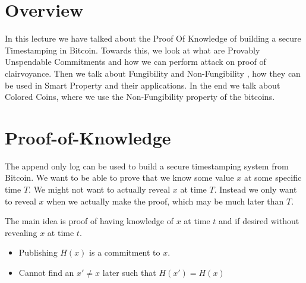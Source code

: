 \documentclass[10pt,a4paper]{article}
\begin{document}
\section{Overview}
In this lecture we have talked about the Proof Of Knowledge of building a secure Timestamping in Bitcoin. Towards this, we look at what are Provably Unspendable Commitments and how we can perform attack on proof of clairvoyance. Then we talk about Fungibility and Non-Fungibility , how they can be used in Smart Property and their applications. In the end we talk about Colored Coins, where we use the Non-Fungibility property of the bitcoins.

\section{Proof-of-Knowledge}
The append only log can be used to build a secure timestamping system from Bitcoin. We want to be able to prove that we know some value $x$ at some specific time $T$. We might not want to actually reveal $x$ at time $T$. Instead we only want to reveal $x$ when we actually make the proof, which may be much later than $T$.

The main idea is proof of having knowledge of $x$ at time $t$ and if desired without revealing $x$ at time $t$.
\begin{itemize}
    \item \textit{} Publishing $H(x)$ is a commitment to $x$.
    \item \textit{} Cannot find an $x' \neq x$ later such that $H(x') = H(x)$
\end{itemize}
\end{document}
